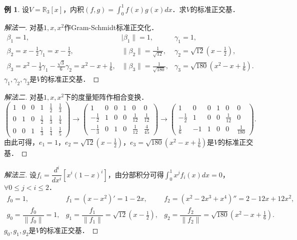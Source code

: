 \documentclass[a4paper,fontset=windows]{ctexbook}
\theoremstyle{definition}
\newtheorem{example}{例}[chapter]
\renewcommand{\le}{\leqslant}
\begin{document}
\begin{example}\label{ex10.10}
设$V=\mathbb{R}_3[x]$，内积$(f,g)=\int_0^1f(x)g(x)dx$．求$V$的标准正交基．
\end{example}

\begin{proof}[解法一]
对基$1,x,x^2$作Gram-Schmidt标准正交化．
$$\begin{array}{lll}
\beta_1=1, &|\beta_1\|=1, &\gamma_1=1, \\
\beta_2=x-\frac{1}{2}\gamma_1=x-\frac{1}{2}, &\|\beta_2\|=\frac{1}{\sqrt{12}}, &\gamma_2=\sqrt{12}(x-\frac{1}{2}), \\
\beta_3=x^2-\frac{1}{3}\gamma_1-\frac{\sqrt{3}}{6}\gamma_2=x^2-x+\frac{1}{6}, &\|\beta_3\|=\frac{1}{\sqrt{180}}, &\gamma_3=\sqrt{180}(x^2-x+\frac{1}{6}).
\end{array}$$
$\gamma_1,\gamma_2,\gamma_3$是$V$的标准正交基．
\end{proof}

\begin{proof}[解法二]
对基$1,x,x^2$下的度量矩阵作相合变换．
$$\begin{pmatrix}1&0&0&1&\frac{1}{2}&\frac{1}{3} \\ 0&1&0&\frac{1}{2}&\frac{1}{3}&\frac{1}{4} \\ 0&0&1&\frac{1}{3}&\frac{1}{4}&\frac{1}{5}\end{pmatrix}\to\begin{pmatrix}1&0&0&1&0&0 \\ -\frac{1}{2}&1&0&0&\frac{1}{12}&\frac{1}{12} \\ -\frac{1}{3}&0&1&0&\frac{1}{12}&\frac{4}{45}\end{pmatrix}\to\begin{pmatrix}1&0&0&1&0&0 \\ -\frac{1}{2}&1&0&0&\frac{1}{12}&0 \\ \frac{1}{6}&-1&1&0&0&\frac{1}{180}\end{pmatrix}.$$
由此可得，$e_1=1$，$e_2=\sqrt{12}(x-\frac{1}{2})$，$e_3=\sqrt{180}(x^2-x+\frac{1}{6})$是$V$的标准正交基．
\end{proof}

\begin{proof}[解法三]
设$f_i=\dfrac{d^i}{dx^i}[x^i(1-x)^i]$，由分部积分可得$\int_0^1x^jf_i(x)dx=0$，$\forall 0\le j<i\le 2$．
$$\begin{array}{lll}
f_0=1,&f_1=(x-x^2)'=1-2x,&f_2=(x^2-2x^3+x^4)''=2-12x+12x^2, \\
g_0=\dfrac{f_0}{\|f_0\|}=1,&g_1=\dfrac{f_1}{\|f_1\|}=\sqrt{12}(x-\frac{1}{2}),&g_2=\dfrac{f_2}{\|f_2\|}=\sqrt{180}(x^2-x+\frac{1}{6}).
\end{array}$$
$g_0,g_1,g_2$是$V$的标准正交基．
\end{proof}
\end{document}
